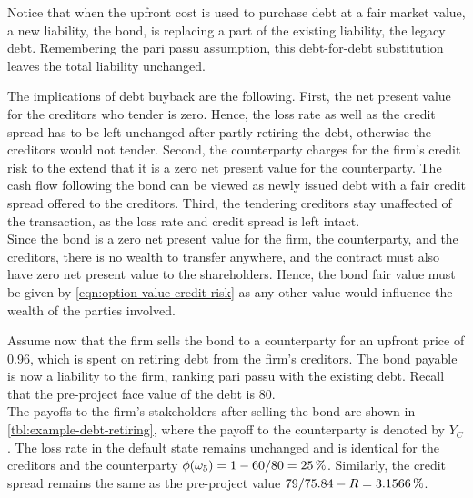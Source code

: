 \documentclass[../main.tex]{subfiles}
\begin{document}
            Notice that when the upfront cost is used to purchase debt at a fair market value, 
            a new liability, the bond, is replacing a part of the existing liability, the legacy debt. 
            Remembering the pari passu assumption, this debt-for-debt substitution 
            leaves the total liability unchanged.

            The implications of debt buyback are the following.
            First, the net present value for the creditors who tender is zero. 
            Hence, the loss rate as well as the credit spread has to be left unchanged
            after partly retiring the debt, otherwise the creditors would not tender. 
            Second, the counterparty charges for the firm's credit risk 
            to the extend that it is a zero net present value for the counterparty. 
            The cash flow following the bond can be viewed as newly issued debt
            with a fair credit spread offered to the creditors.
            Third, the tendering creditors stay unaffected of the transaction, 
            as the loss rate and credit spread is left intact.
            \\
            Since the bond is a zero net present value for the firm, 
            the counterparty, and the creditors, there is no wealth to transfer anywhere,
            and the contract must also have zero net present value to the shareholders. 
            Hence, the bond fair value must be given by \cref{eqn:option-value-credit-risk} 
            as any other value would influence the wealth of the parties involved.

            Assume now that the firm sells the bond to a counterparty
            for an upfront price of \num{0.96},
            which is spent on retiring debt from the firm's creditors. 
            The bond payable is now a liability to the firm, 
            ranking pari passu with the existing debt.
            Recall that the pre-project face value of the debt is \num{80}.
            \\ 
            The payoffs to the firm's stakeholders after selling the bond 
            are shown in \cref{tbl:example-debt-retiring},
            where the payoff to the counterparty is denoted by $Y_{C}$. 
            The loss rate in the default state remains unchanged 
            and is identical for the creditors and the counterparty
            $\phi(\omega_{5})=1-\num{60}/\num{80}=\pct{0.25}$. 
            Similarly, the credit spread remains the same as the pre-project value
            $\num{79}/\num{75.84}-R=\pct{0.031566}$.
            
\end{document}
